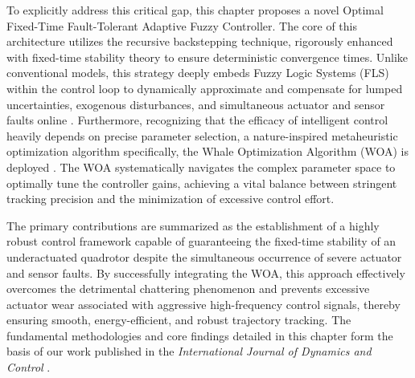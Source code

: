 To explicitly address this critical gap, this chapter proposes a novel Optimal Fixed-Time Fault-Tolerant Adaptive Fuzzy Controller. The core of this architecture utilizes the recursive backstepping technique, rigorously enhanced with fixed-time stability theory to ensure deterministic convergence times. Unlike conventional models, this strategy deeply embeds Fuzzy Logic Systems (FLS) within the control loop to dynamically approximate and compensate for lumped uncertainties, exogenous disturbances, and simultaneous actuator and sensor faults online \cite{Wang1994}. Furthermore, recognizing that the efficacy of intelligent control heavily depends on precise parameter selection, a nature-inspired metaheuristic optimization algorithm specifically, the Whale Optimization Algorithm (WOA) is deployed \cite{woa}. The WOA systematically navigates the complex parameter space to optimally tune the controller gains, achieving a vital balance between stringent tracking precision and the minimization of excessive control effort.

The primary contributions are summarized as the establishment of a highly robust control framework capable of guaranteeing the  fixed-time stability of an underactuated quadrotor despite the simultaneous occurrence of severe actuator and sensor faults. By successfully integrating the WOA, this approach effectively overcomes the detrimental chattering phenomenon and prevents excessive actuator wear associated with aggressive high-frequency control signals, thereby ensuring smooth, energy-efficient, and robust trajectory tracking. The fundamental methodologies and core findings detailed in this chapter form the basis of our work published in the \textit{International Journal of Dynamics and Control} \cite{my2article}.


